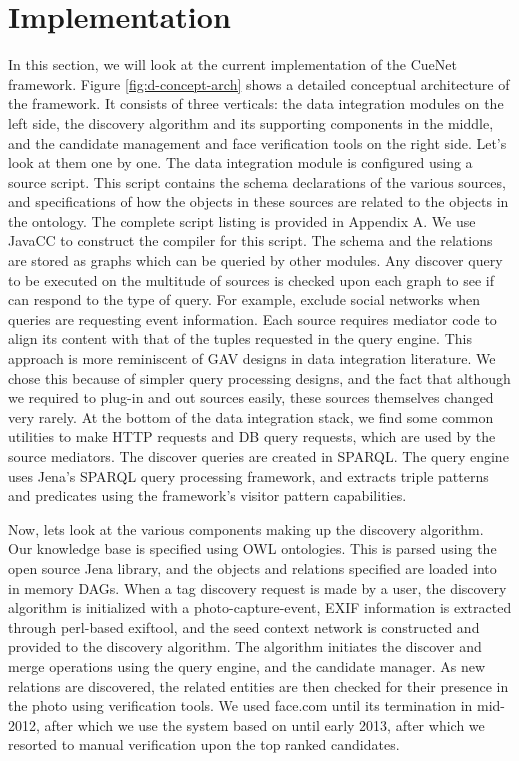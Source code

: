 \section{Implementation}

In this section, we will look at the current implementation of the CueNet framework. Figure \ref{fig:d-concept-arch} shows a detailed conceptual architecture of the framework. It consists of three verticals: the data integration modules on the left side, the discovery algorithm and its supporting components in the middle, and the candidate management and face verification tools on the right side. Let's look at them one by one. The data integration module is configured using a source script. This script contains the schema declarations of the various sources, and specifications of how the objects in these sources are related to the objects in the ontology. The complete script listing is provided in Appendix A. We use JavaCC to construct the compiler for this script. The schema and the relations are stored as graphs which can be queried by other modules. Any discover query to be executed on the multitude of sources is checked upon each graph to see if can respond to the type of query. For example, exclude social networks when queries are requesting event information. Each source requires mediator code to align its content with that of the tuples requested in the query engine. This approach is more reminiscent of GAV designs in data integration literature. We chose this because of simpler query processing designs, and the fact that although we required to plug-in and out sources easily, these sources themselves changed very rarely. At the bottom of the data integration stack, we find some common utilities to make HTTP requests and DB query requests, which are used by the source mediators. The discover queries are created in SPARQL. The query engine uses Jena's SPARQL query processing framework, and extracts triple patterns and predicates using the framework's visitor pattern capabilities.

Now, lets look at the various components making up the discovery algorithm. Our knowledge base is specified using OWL ontologies. This is parsed using the open source Jena library, and the objects and relations specified are loaded into in memory DAGs. When a tag discovery request is made by a user, the discovery algorithm is initialized with a photo-capture-event, EXIF information is extracted through perl-based exiftool, and the seed context network is constructed and provided to the discovery algorithm. The algorithm initiates the discover and merge operations using the query engine, and the candidate manager. As new relations are discovered, the related entities are then checked for their presence in the photo using verification tools. We used face.com until its termination in mid-2012, after which we use the system based on \cite{nk_attribute_classifiers} until early 2013, after which we resorted to manual verification upon the top ranked candidates.


